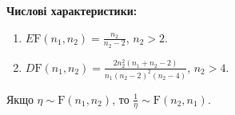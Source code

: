 \noindent\textbf{Числові характеристики:}
\begin{enumerate}
    \item $E\mathrm{F}(n_1, n_2) = \frac{n_2}{n_2 - 2}$, $n_2 > 2$.
    \item $D\mathrm{F}(n_1, n_2) = \frac{2 n_2^2 (n_1 + n_2 - 2)}{n_1 (n_2 - 2)^2 (n_2 -4)}$, $n_2>4$.
\end{enumerate}

\begin{remark}
    Якщо $\eta \sim \mathrm{F}(n_1, n_2)$, то $\frac{1}{\eta} \sim \mathrm{F}(n_2, n_1)$.
\end{remark}